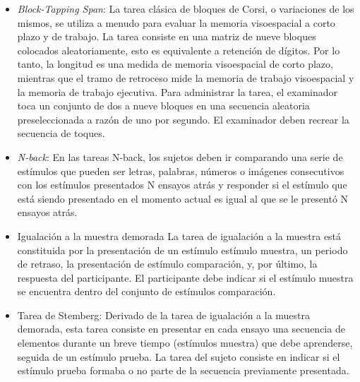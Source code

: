 \documentclass[12pt,letterpaper,final]{article}
\begin{document}
\begin{itemize}
	\item \textit{Block-Tapping Span}:
	La tarea clásica de bloques de Corsi, o variaciones de los mismos, se utiliza a menudo para evaluar la memoria visoespacial a corto plazo y de trabajo. La tarea consiste en una matriz de nueve bloques colocados aleatoriamente, esto es equivalente a retención de dígitos. Por lo tanto, la longitud es una medida de memoria visoespacial de corto plazo, mientras que el tramo de retroceso mide la memoria de trabajo visoespacial y la memoria de trabajo ejecutiva. Para administrar la tarea, el examinador toca un conjunto de dos a nueve bloques en una secuencia aleatoria preseleccionada a razón de uno por segundo. El examinador deben recrear la secuencia de toques.

\item \textit{N-back}:
	En las tareas N-back, los sujetos deben ir comparando
	una serie de estímulos que pueden ser letras, palabras, números o imágenes consecutivos con los estímulos presentados N ensayos
	atrás y responder si el estímulo que está siendo presentado en el momento actual es igual al que se le presentó N ensayos atrás.

	
	\item Igualación a la muestra demorada
	La tarea de igualación a la muestra está constituida por la presentación de un estímulo estímulo muestra, un periodo de retraso, la presentación de estímulo comparación, y, por último, la respuesta del participante. El participante debe indicar si el estímulo muestra se encuentra dentro del conjunto de estímulos comparación.

	\item Tarea de Stemberg:
Derivado de la tarea de igualación a la muestra demorada, esta tarea consiste en presentar en cada ensayo una secuencia de elementos durante un breve tiempo (estímulos muestra) que debe aprenderse, seguida de un estímulo prueba. La tarea del sujeto consiste en indicar si el estímulo prueba formaba o no parte de la secuencia previamente presentada. 
\end{itemize}
\end{document}
